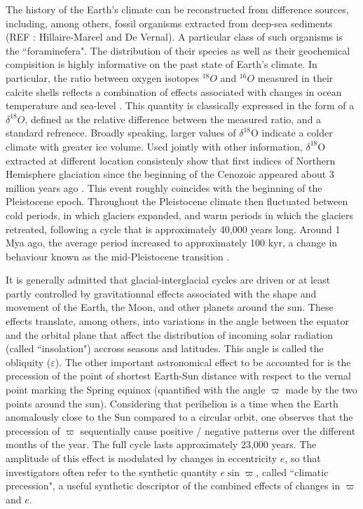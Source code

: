 \documentclass[a4paper,12pt]{article}
\begin{document}
The history of the Earth's climate can be reconstructed from difference sources, 
including, among others,  fossil organisms extracted from deep-sea sediments (REF : Hillaire-Marcel and 
De Vernal). A particular class of such organisms is the ``foraminefera". The distribution of their species
as well as their geochemical compisition is highly informative on the past state of Earth's climate.
In particular, 
the ratio between oxygen isotopes $^{18}O$ and $^{16}O$ measured in their calcite shells
reflects a combination of effects associated with changes in ocean temperature and sea-level 
\cite{emiliani55, shackleton67}. 
This quantity is classically expressed in the form  of a $\delta^{18}O$, defined as the relative 
difference between the measured ratio, and a standard refrenece. 
Broadly speaking, larger values of $\delta^{18}$O 
indicate a colder climate with greater ice volume.
Used jointly with other information, $\delta^{18}$O extracted at different location consistenly show 
that first indices of Northern Hemisphere glaciation since the beginning of the Cenozoic appeared  about 3 million
years ago \cite{Shackleton84ab}. This event roughly coincides with the beginning of the Pleistocene epoch. 
Throughout the Pleistocene climate then fluctuated between cold periods, in which glaciers expanded, and warm
periods in which the glaciers retreated, following a cycle that is approximately 40,000 years long. 
Around 1 Mya ago, the average period increased to approximately  100 kyr, a change in behaviour known as
the mid-Pleistocene transition \cite{Ruddiman86}. 

It is generally admitted that glacial-interglacial cycles are driven or at least partly controlled
by gravitationnal effects associated  with the shape and movement of the Earth, the Moon, and other planets 
around the sun.
These effects translate, among others, into variations in 
the angle between the equator and the orbital plane that affect the distribution of incoming solar radiation
(called ``insolation") accross seasons and latitudes. This angle is called the obliquity ($\varepsilon$). 
The other important astronomical effect to be accounted for is
the precession of the point of shortest Earth-Sun distance with respect to the vernal point marking the Spring
equinox (quantified with the angle $\varpi$ made by the two points around the sun).
Considering that perihelion is a time when the Earth anomalously close to the Sun compared to a circular orbit, one observes that
the precession of $\varpi$ sequentially cause positive / negative patterns over the different months of the year. The full cycle lasts
approximately 23,000 years. The amplitude of this effect is modulated by changes
in eccentricity $e$, so that investigators often refer to the synthetic quantity $e\sin\varpi$, called ``climatic precession", 
a useful synthetic descriptor of the combined effects of changes in $\varpi$ and $e$. 
\end{document}
